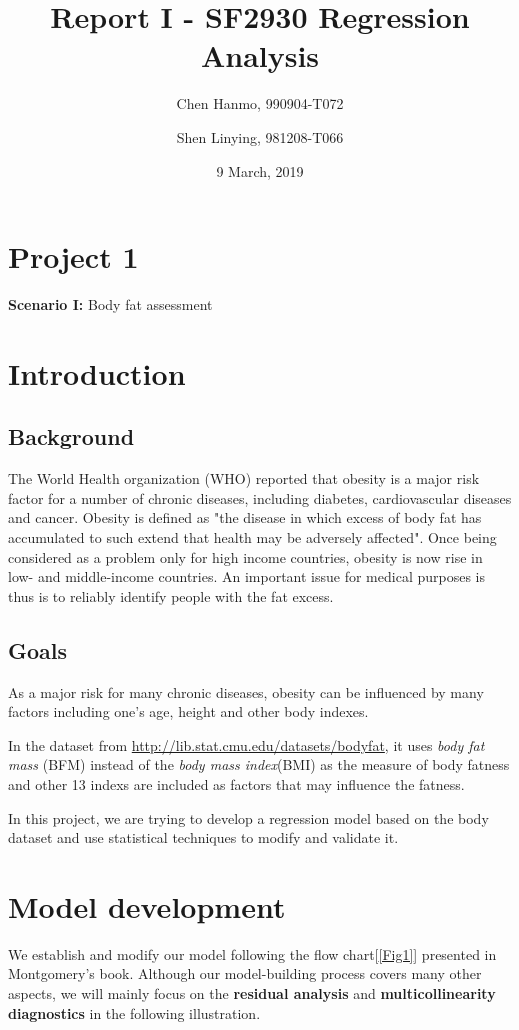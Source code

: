 \documentclass[11pt]{article}
\title{Report I - SF2930 Regression Analysis}
\author{Chen Hanmo, 990904-T072 \and  Shen Linying, 981208-T066}
\date{9 March, 2019}
\begin{document}
\maketitle

\tableofcontents
\newpage

\section*{Project 1}


\noindent 
 {\bf Scenario I:}  Body fat assessment

\vspace{2mm}


\section{Introduction}

\subsection{Background} 

The World Health organization (WHO) reported that obesity is a major risk factor for a number of chronic diseases, including diabetes, cardiovascular diseases and cancer. Obesity is defined as "the disease in which excess of body fat has accumulated to such extend that health may be adversely affected". Once being considered as a problem only for high income countries, obesity is now rise in low- and middle-income countries. An important issue for medical purposes is thus is to reliably identify people with the fat excess.


\subsection{Goals}

As a major risk for many chronic diseases, obesity can be influenced by many factors including one's age, height and other body indexes. 

In the dataset from \url{http://lib.stat.cmu.edu/datasets/bodyfat}, it uses {\it body fat mass }(BFM) instead of the {\it body mass index}(BMI) as the measure of body fatness and other 13 indexs are included as factors that may influence the fatness.

In this project, we are trying to develop a regression model based on the body dataset and use statistical techniques to modify and validate it.
\section{Model development} 
We establish and modify our model following the flow chart[\ref{Fig1}] presented in Montgomery's book. Although our model-building process covers many other aspects, we will mainly focus on the {\bf residual analysis} and {\bf multicollinearity diagnostics} in the following illustration.
\end{document}
